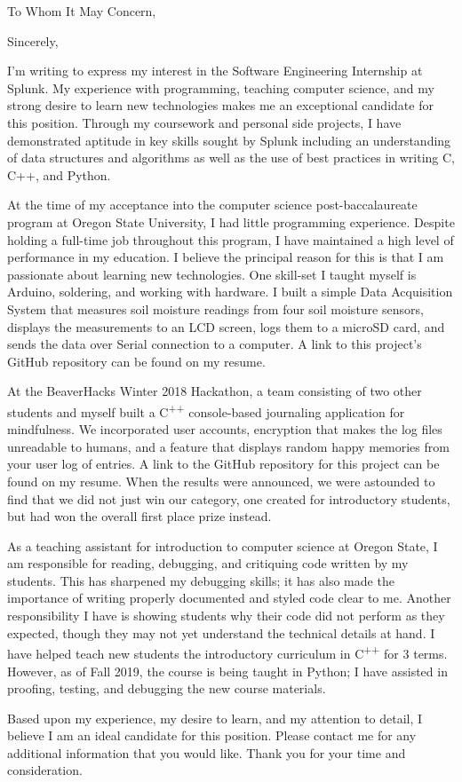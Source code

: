 \documentclass[11pt,a4paper,roman]{moderncv}        %
\begin{document}
\date{October 17, 2019}
\opening{To Whom It May Concern,}
\closing{Sincerely,}
\makelettertitle

I'm writing to express my interest in the Software Engineering Internship at Splunk. My experience with programming, teaching computer science, and my strong desire to learn new technologies makes me an exceptional candidate for this position. Through my coursework and personal side projects, I have demonstrated aptitude in key skills sought by Splunk including an understanding of data structures and algorithms as well as the use of best practices in writing C, C++, and Python. 
 
At the time of my acceptance into the computer science post-baccalaureate program at Oregon State University, I had little programming experience. Despite holding a full-time job throughout this program, I have maintained a high level of performance in my education. I believe the principal reason for this is that I am passionate about learning new technologies. One skill-set I taught myself is Arduino, soldering, and working with hardware. I built a simple Data Acquisition System that measures soil moisture readings from four soil moisture sensors, displays the measurements to an LCD screen, logs them to a microSD card, and sends the data over Serial connection to a computer. A link to this project's GitHub repository can be found on my resume.

At the BeaverHacks Winter 2018 Hackathon, a team consisting of two other students and myself built a C\textsuperscript{++} console-based journaling application for mindfulness. We incorporated user accounts, encryption that makes the log files unreadable to humans, and a feature that displays random happy memories from your user log of entries. A link to the  GitHub repository for this project can be found on my resume. When the results were announced, we were astounded to find that we did not just win our category, one created for introductory students, but had won the overall first place prize instead.

As a teaching assistant for introduction to computer science at Oregon State, I am responsible for reading, debugging, and critiquing code written by my students. This has sharpened my debugging skills; it has also made the importance of writing properly documented and styled code clear to me. Another responsibility I have is showing students why their code did not perform as they expected, though they may not yet understand the technical details at hand. I have helped teach new students the introductory curriculum in C\textsuperscript{++} for 3 terms. However, as of Fall 2019, the course is being taught in Python; I have assisted in proofing, testing, and debugging the new course materials.


Based upon my experience, my desire to learn, and my attention to detail, I believe I am an ideal candidate for this position. Please contact me for any additional information that you would like. Thank you for your time and consideration. 



\makeletterclosing
\end{document}
